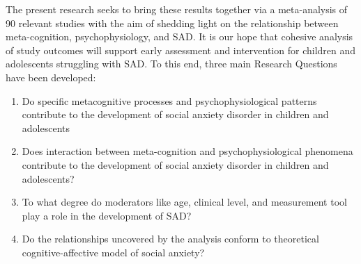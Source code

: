 The present research seeks to bring these results together via a meta-analysis of 90 relevant studies with the aim of shedding light on the relationship between meta-cognition, psychophysiology, and SAD. It is our hope that cohesive analysis of study outcomes will support early assessment and intervention for children and adolescents struggling with SAD. To this end, three main Research Questions have been developed:
\begin{enumerate}
    \item Do specific metacognitive processes and psychophysiological patterns contribute to the development of social anxiety disorder in children and adolescents
    \item Does interaction between meta-cognition and psychophysiological phenomena contribute to the development of social anxiety disorder in children and adolescents?
    
    \item To what degree do moderators like age, clinical level, and measurement tool play a role in the development of SAD?
    \item Do the relationships uncovered by the analysis conform to theoretical cognitive-affective model of social anxiety?
   

\end{enumerate}